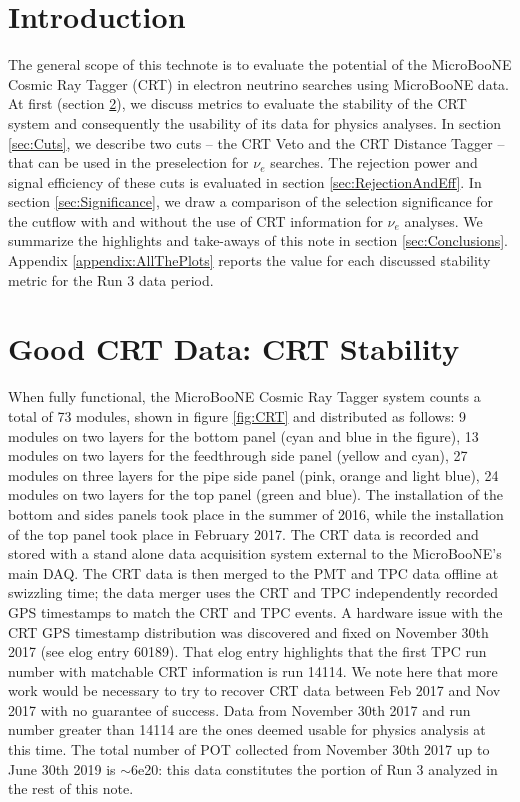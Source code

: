 \section{Introduction}\label{sec:Introduction}
The general scope of this technote is to evaluate the potential of the MicroBooNE Cosmic Ray Tagger (CRT) in electron neutrino searches using MicroBooNE data.  At first (section \ref{sec:Stability}), we discuss metrics to evaluate the stability of the CRT system and consequently the usability of its data for physics analyses. In section \ref{sec:Cuts}, we describe two cuts -- the CRT Veto and the CRT Distance Tagger -- that can be used in  the  preselection for $\nu_e$ searches. The rejection power and signal efficiency of these cuts is evaluated in section \ref{sec:RejectionAndEff}. In section \ref{sec:Significance}, we draw a comparison of the selection significance for the cutflow with and without the use of CRT information for $\nu_e$ analyses. We summarize the highlights and take-aways of this note in section \ref{sec:Conclusions}. Appendix \ref{appendix:AllThePlots} reports the value for each discussed stability metric for the Run 3 data period.

\section{Good CRT Data: CRT Stability}\label{sec:Stability}
When fully functional, the MicroBooNE Cosmic Ray Tagger system counts a total of 73 modules, shown in figure \ref{fig:CRT} and distributed as follows: 9 modules on two layers for the bottom panel (cyan and blue in the figure), 13 modules on two layers for the feedthrough side panel (yellow and cyan),  27 modules on three layers for the pipe side panel (pink, orange and light blue),  24 modules on two layers for the top panel (green and blue).  The installation of the bottom and sides panels took place in the summer of 2016, while the installation of the top panel took place in February 2017. 
The CRT data is recorded and stored with a stand alone data acquisition system external to the MicroBooNE's main DAQ. The CRT data is then merged to the PMT and TPC data offline at swizzling time; the data merger uses the CRT and TPC independently recorded GPS timestamps to match the CRT and TPC events. A hardware issue with the CRT GPS timestamp distribution was discovered and fixed on November 30th 2017 (see elog entry 60189). That elog entry highlights that the first TPC run number with matchable CRT information is run 14114.  We note here that more work would be necessary to try to recover CRT data between Feb 2017 and Nov 2017 with no guarantee of success. 
Data from November 30th 2017 and run number greater than 14114 are the ones deemed usable for physics analysis at this time. The total number of POT collected from November 30th 2017 up to June 30th 2019 is $\sim$6e20: this data constitutes the portion of Run 3 analyzed in the rest of this note.  


